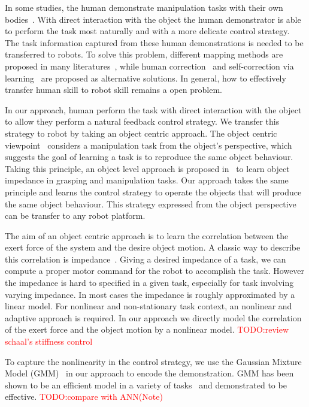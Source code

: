 In some studies, the human demonstrate manipulation tasks with their own bodies~\cite{asfour2008imitation}. With direct interaction with the object the human demonstrator is able to perform the task most naturally and with a more delicate control strategy. The task information captured from these human demonstrations is needed to be transferred to robots. To solve this problem, different mapping methods are proposed in many literatures~\cite{do2011towards,asfour2008imitation,hueser2006learning}, while human correction~\cite{calinon2007incremental,sauser2011iterative,romano2011human} and self-correction via learning~\cite{bidan2013robio} are proposed as alternative solutions. In general, how to effectively transfer human skill to robot skill remains a open problem.

In our approach, human perform the task with direct interaction with the object to allow they perform a natural feedback control strategy. We transfer this strategy to robot by taking an object centric approach. The object centric viewpoint~\cite{okamura2000overview} considers a manipulation task from the object's perspective, which suggests the goal of learning a task is to reproduce the same object behaviour. Taking this principle, an object level approach is proposed in~\cite{Miao2014} to learn object impedance in grasping and manipulation tasks. Our approach takes the same principle and learns the control strategy to operate the objects that will produce the same object behaviour. This strategy expressed from the object perspective can be transfer to any robot platform.

The aim of an object centric approach is to learn the correlation between the exert force of the system and the desire object motion. A classic way to describe this correlation is impedance~\cite{howard2010transferring,wimbock2012comparison}. Giving a desired impedance of a task, we can compute a proper motor command for the robot to accomplish the task. However the impedance is hard to specified in a given task, especially for task involving varying impedance. In most cases the impedance is roughly approximated by a linear model. For nonlinear and non-stationary task context, an nonlinear and adaptive approach is required. In our approach we directly model the correlation of the exert force and the object motion by a nonlinear model. \textcolor{red}{TODO:review schaal's stiffness control}

To capture the nonlinearity in the control strategy, we use the Gaussian Mixture Model (GMM)~\cite{cohn1996active} in our approach to encode the demonstration. GMM has been shown to be an efficient model in a variety of tasks~\cite{huang2013learning,sauser2011iterative,calinon2007incremental} and demonstrated to be effective.
\textcolor{red}{TODO:compare with ANN(Note)}


